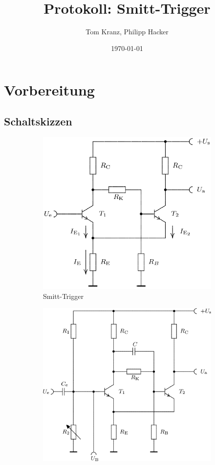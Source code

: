 \documentclass[numbers=noenddot,10pt,a4paper]{scrartcl}
\title{Protokoll: Smitt-Trigger}
\author{Tom Kranz, Philipp Hacker}
\date{\today}
\begin{document}
\maketitle
\vspace*{\fill}
\tableofcontents
\vfill
\newpage
\section{Vorbereitung}
\subsection{Schaltskizzen}
\begin{figure}[H]
\centering
\begin{subfigure}[b]{0.49\textwidth}
\includegraphics[width=\textwidth]{schaltskizze_st2.png}
\caption{Smitt-Trigger}
\end{subfigure}
\begin{subfigure}[b]{0.49\textwidth}
\includegraphics[width=\textwidth]{schaltskizze_st1.png}

\end{subfigure}
\end{figure}
\end{document}
